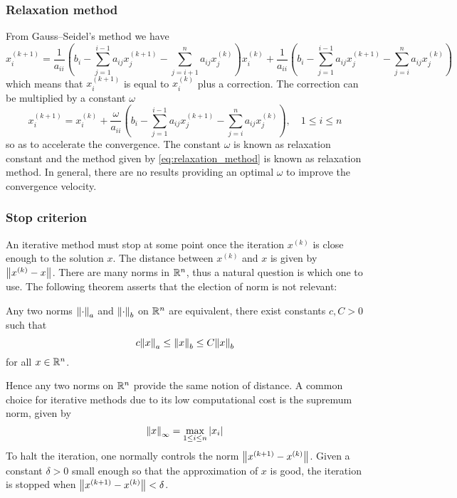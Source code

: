 \subsubsection{Relaxation method}

From Gauss--Seidel's method we have
\begin{equation}
    x_i^{(k+1)} = 
    \frac{1}{a_{ii}} 
    \left( b_i - \sum_{j=1}^{i-1} a_{ij} x_j^{(k+1)} - \sum_{j=i+1}^{n} a_{ij} x_j^{(k)} \right)
    x_i^{(k)} + 
    \frac{1}{a_{ii}} \left( b_i - \sum_{j=1}^{i-1} a_{ij} x_j^{(k+1)} - \sum_{j=i}^{n} a_{ij} x_j^{(k)} \right)
\end{equation}
which means that $x_i^{(k+1)}$ is equal to $x_i^{(k)}$ plus a correction. The
correction can be multiplied by a constant $\omega$
\begin{equation} \label{eq:relaxation_method}
    x_i^{(k+1)} = 
    x_i^{(k)} + 
    \frac{\omega}{a_{ii}} \left( b_i - \sum_{j=1}^{i-1} a_{ij} x_j^{(k+1)} - \sum_{j=i}^{n} a_{ij} x_j^{(k)} \right),
    \quad 1 \leq i \leq n
\end{equation}
so as to accelerate the convergence. The constant $\omega$ is known as
relaxation constant and the method given by \eqref{eq:relaxation_method} is
known as relaxation method. In general, there are no results providing an
optimal $\omega$ to improve the convergence velocity.

\subsubsection{Stop criterion}

An iterative method must stop at some point once the iteration $x^{(k)}$ is
close enough to the solution $x$. The distance between $x^{(k)}$ and $x$ is
given by $\norm{x^{(k)} - x}$. There are many norms in $\mathbb{R}^n$, thus a natural
question is which one to use. The following theorem asserts that the election of
norm is not relevant:

\begin{theorem}
    Any two norms $\norm{\cdot}_a$ and $\norm{\cdot}_b$ on $\mathbb{R}^n$ are
    equivalent, \ie there exist constants $c, C > 0$ such that
    \begin{equation}
        c \norm{x}_a \leq \norm{x}_b \leq C \norm{x}_b
    \end{equation}
    for all $x \in \mathbb{R}^n$.
\end{theorem}

\noindent
Hence any two norms on $\mathbb{R}^n$ provide the same notion of distance. A common
choice for iterative methods due to its low computational cost is the supremum
norm, given by
\begin{equation}
    \norm{x}_\infty = \max_{1 \leq i \leq n} \abs{x_i}
\end{equation}
To halt the iteration, one normally controls the norm $\norm{x^{(k+1)} -
x^{(k)}}$. Given a constant $\delta > 0$ small enough so that the approximation
of $x$ is good, the iteration is stopped when $\norm{x^{(k+1)} - x^{(k)}} <
\delta$.



